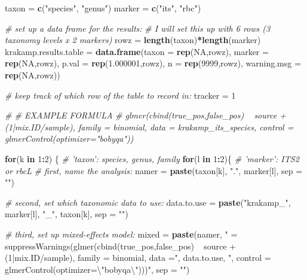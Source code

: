 \documentclass[
]{article}
\newenvironment{Shaded}{\begin{snugshade}}{\end{snugshade}}
\newcommand{\CharTok}[1]{\textcolor[rgb]{0.31,0.60,0.02}{#1}}
\newcommand{\CommentTok}[1]{\textcolor[rgb]{0.56,0.35,0.01}{\textit{#1}}}
\newcommand{\ControlFlowTok}[1]{\textcolor[rgb]{0.13,0.29,0.53}{\textbf{#1}}}
\newcommand{\DataTypeTok}[1]{\textcolor[rgb]{0.13,0.29,0.53}{#1}}
\newcommand{\DecValTok}[1]{\textcolor[rgb]{0.00,0.00,0.81}{#1}}
\newcommand{\FloatTok}[1]{\textcolor[rgb]{0.00,0.00,0.81}{#1}}
\newcommand{\KeywordTok}[1]{\textcolor[rgb]{0.13,0.29,0.53}{\textbf{#1}}}
\newcommand{\NormalTok}[1]{#1}
\newcommand{\OperatorTok}[1]{\textcolor[rgb]{0.81,0.36,0.00}{\textbf{#1}}}
\newcommand{\OtherTok}[1]{\textcolor[rgb]{0.56,0.35,0.01}{#1}}
\newcommand{\StringTok}[1]{\textcolor[rgb]{0.31,0.60,0.02}{#1}}
\begin{document}
\begin{Shaded}
\begin{Highlighting}[]
\NormalTok{taxon =}\StringTok{ }\KeywordTok{c}\NormalTok{(}\StringTok{"species"}\NormalTok{, }\StringTok{"genus"}\NormalTok{)}
\NormalTok{marker =}\StringTok{ }\KeywordTok{c}\NormalTok{(}\StringTok{"its"}\NormalTok{, }\StringTok{"rbc"}\NormalTok{)}

\CommentTok{# set up a data frame for the results: }
\CommentTok{# I will set this up with 6 rows (3 taxonomy levels x 2 markers)}
\NormalTok{rowz =}\StringTok{ }\KeywordTok{length}\NormalTok{(taxon)}\OperatorTok{*}\KeywordTok{length}\NormalTok{(marker)}
\NormalTok{krakamp.results.table =}\StringTok{ }\KeywordTok{data.frame}\NormalTok{(}\DataTypeTok{taxon  =} \KeywordTok{rep}\NormalTok{(}\OtherTok{NA}\NormalTok{,rowz), }\DataTypeTok{marker  =} \KeywordTok{rep}\NormalTok{(}\OtherTok{NA}\NormalTok{,rowz), }\DataTypeTok{p.val  =} \KeywordTok{rep}\NormalTok{(}\FloatTok{1.000001}\NormalTok{,rowz), }\DataTypeTok{n  =} \KeywordTok{rep}\NormalTok{(}\DecValTok{9999}\NormalTok{,rowz), }\DataTypeTok{warning.msg =} \KeywordTok{rep}\NormalTok{(}\OtherTok{NA}\NormalTok{,rowz))}

\CommentTok{# keep track of which row of the table to record in:}
\NormalTok{tracker =}\StringTok{ }\DecValTok{1}

\CommentTok{# # EXAMPLE FORMULA}
\CommentTok{# glmer(cbind(true_pos,false_pos) ~ source + (1|mix.ID/sample), family = binomial, data = krakamp_its_species, control = glmerControl(optimizer="bobyqa"))}


\ControlFlowTok{for}\NormalTok{(k }\ControlFlowTok{in} \DecValTok{1}\OperatorTok{:}\DecValTok{2}\NormalTok{) \{ }\CommentTok{# 'taxon': species, genus, family}
    \ControlFlowTok{for}\NormalTok{(l }\ControlFlowTok{in} \DecValTok{1}\OperatorTok{:}\DecValTok{2}\NormalTok{)\{ }\CommentTok{# 'marker': ITS2 or rbcL}
        \CommentTok{# first, name the analysis:}
\NormalTok{        namer =}\StringTok{ }\KeywordTok{paste}\NormalTok{(taxon[k], }\StringTok{"."}\NormalTok{, marker[l], }\DataTypeTok{sep =} \StringTok{""}\NormalTok{)}
        
        \CommentTok{# second, set which taxonomic data to use:}
\NormalTok{        data.to.use =}\StringTok{ }\KeywordTok{paste}\NormalTok{(}\StringTok{"krakamp_"}\NormalTok{, marker[l], }\StringTok{"_"}\NormalTok{, taxon[k], }\DataTypeTok{sep =} \StringTok{""}\NormalTok{)}
        
        \CommentTok{# third, set up mixed-effects model: }
\NormalTok{        mixed =}\StringTok{ }\KeywordTok{paste}\NormalTok{(namer, }\StringTok{" = suppressWarnings(glmer(cbind(true_pos,false_pos) ~ source + (1|mix.ID/sample), family = binomial, data ="}\NormalTok{, data.to.use, }\StringTok{", control = glmerControl(optimizer=}\CharTok{\textbackslash{}"}\StringTok{bobyqa}\CharTok{\textbackslash{}"}\StringTok{)))"}\NormalTok{, }\DataTypeTok{sep =} \StringTok{""}\NormalTok{)}
        

\end{Highlighting}
\end{Shaded}
\end{document}
